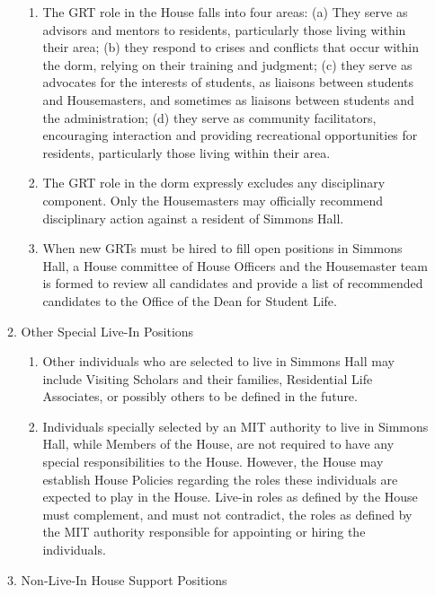 \documentclass[letterpaper]{article}
\begin{document}
\begin{enumerate}
\begin{enumerate}
\begin{enumerate}
\item The GRT role in the House falls into four areas: (a) They serve as advisors and mentors to residents, particularly those living within their area; (b) they respond to crises and conflicts that occur within the dorm, relying on their training and judgment; (c) they serve as advocates for the interests of students, as liaisons between students and Housemasters, and sometimes as liaisons between students and the administration; (d) they serve as community facilitators, encouraging interaction and providing recreational opportunities for residents, particularly those living within their area.

\item The GRT role in the dorm expressly excludes any disciplinary component. Only the Housemasters may officially recommend disciplinary action against a resident of Simmons Hall.

\item When new GRTs must be hired to fill open positions in Simmons Hall, a House committee of House Officers and the Housemaster team is formed to review all candidates and provide a list of recommended candidates to the Office of the Dean for Student Life.

\end{enumerate}

\item Other Special Live-In Positions 

\begin{enumerate}

\item Other individuals who are selected to live in Simmons Hall may include Visiting Scholars and their families, Residential Life Associates, or possibly others to be defined in the future.

\item Individuals specially selected by an MIT authority to live in Simmons Hall, while Members of the House, are not required to have any special responsibilities to the House. However, the House may establish House Policies regarding the roles these individuals are expected to play in the House. Live-in roles as defined by the House must complement, and must not contradict, the roles as defined by the MIT authority responsible for appointing or hiring the individuals.

\end{enumerate}

\item Non-Live-In House Support Positions 


\end{enumerate}
\end{enumerate}
\end{document}
